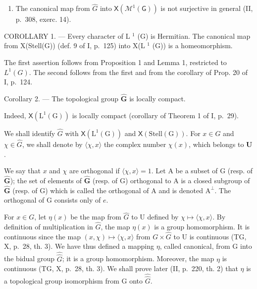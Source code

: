 \begin{enumerate}
\def\labelenumi{\arabic{enumi})}
\setcounter{enumi}{1}
\tightlist
\item
  The canonical map from \(\widehat{G}\) into \(\mathsf{X}(\mathcal{M}^{1}(\mathsf{G}))\) is not surjective in general (II, p.~308, exerc. 14).
\end{enumerate}

COROLLARY 1. --- Every character of L \(^{1}\) (G) is Hermitian. The canonical map from X(Stell(G)) (def. 9 of I, p.~125) into X(L \(^{1}\) (G)) is a homeomorphism.

The first assertion follows from Proposition 1 and Lemma 1, restricted to \(L^{1}(G)\). The second follows from the first and from the corollary of Prop. 20 of I, p.~124.

Corollary 2. --- The topological group \(\widehat{\mathbf{G}}\) is locally compact.

Indeed, \(\mathsf{X}(\mathrm{L}^{1}(\mathrm{G}))\) is locally compact (corollary of Theorem 1 of I, p.~29).

We shall identify \(\widehat{G}\) with \(\mathsf{X}(\mathrm{L}^1 (\mathrm{G}))\) and \(\mathsf{X}(\mathrm{Stell}(\mathrm{G}))\). For \(x\in G\) and \(\chi \in \widehat{G}\), we shall denote by \(\langle \chi ,x\rangle\) the complex number \(\chi (x)\), which belongs to \(\mathbf{U}\).

We say that \(x\) and \(\chi\) are orthogonal if \(\langle \chi, x \rangle = 1\). Let A be a subset of G (resp. of \(\widehat{\mathbf{G}}\)); the set of elements of \(\widehat{\mathbf{G}}\) (resp. of G) orthogonal to A is a closed subgroup of \(\widehat{\mathbf{G}}\) (resp. of G) which is called the orthogonal of A and is denoted \(\mathrm{A}^{\perp}\). The orthogonal of G consists only of \(e\).

For \(x \in G\), let \(\eta(x)\) be the map from \(\widehat{G}\) to U defined by \(\chi \mapsto \langle \chi, x \rangle\). By definition of multiplication in \(\widehat{G}\), the map \(\eta(x)\) is a group homomorphism. It is continuous since the map \((x, \chi) \mapsto \langle \chi, x \rangle\) from \(G \times \widehat{G}\) to U is continuous (TG, X, p.~28, th. 3). We have thus defined a mapping \(\eta\), called canonical, from G into the bidual group \(\widehat{\widehat{G}}\); it is a group homomorphism. Moreover, the map \(\eta\) is continuous (TG, X, p.~28, th. 3). We shall prove later (II, p.~220, th. 2) that \(\eta\) is a topological group isomorphism from G onto \(\widehat{\widehat{G}}\).

